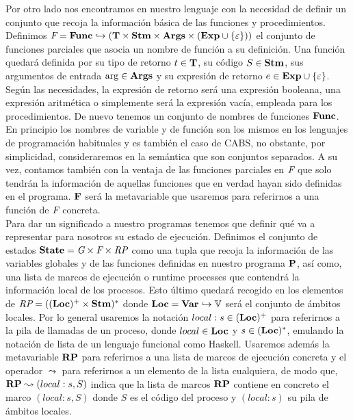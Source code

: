 Por otro lado nos encontramos en nuestro lenguaje con la necesidad de definir un conjunto que recoja la información básica de las funciones y procedimientos. Definimos $\Fs = \Func \hookrightarrow (\T \times \Stm \times \Args \times (\Exp \cup \{\varepsilon\}))$ el conjunto de funciones parciales que asocia un nombre de función a su definición. Una función quedará definida por su tipo de retorno $t \in \T$, su código $S \in \Stm$, sus argumentos de entrada $\args \in \Args$ y su expresión de retorno $e \in \Exp \cup \{\varepsilon\}$. Según las necesidades, la expresión de retorno será una expresión booleana, una expresión aritmética o simplemente será la expresión vacía, empleada para los procedimientos. De nuevo tenemos un conjunto de nombres de funciones $\Func$. En principio los nombres de variable y de función son los mismos en los lenguajes de programación habituales y es también el caso de CABS, no obstante, por simplicidad, consideraremos en la semántica que son conjuntos separados. A su vez, contamos también con la ventaja de las funciones parciales en $\Fs$ que solo tendrán la información de aquellas funciones que en verdad hayan sido definidas en el programa. $\F$ será la metavariable que usaremos para referirnos a una función de $\Fs$ concreta.\\

Para dar un significado a nuestro programas tenemos que definir qué va a representar para nosotros su estado de ejecución. Definimos el conjunto de estados $\State = \Gs \times \Fs \times \RPs$ como una tupla que recoja la información de las variables globales y de las funciones definidas en nuestro programa $\P$, así como, una lista de marcos de ejecución o runtime processes que contendrá la información local de los procesos. Esto último quedará recogido en los elementos de $\RPs = ((\loc)^+ \times \Stm)^*$ donde $\loc = \Var \hookrightarrow \V$ será el conjunto de ámbitos locales. Por lo general usaremos la notación $local:s \in (\loc)^+$ para referirnos a la pila de llamadas de un proceso, donde $local \in \loc$ y $s \in (\loc)^*$, emulando la notación de lista de un lenguaje funcional como Haskell. Usaremos además la metavariable $\RP$ para referirnos a una lista de marcos de ejecución concreta y el operador $\leadsto$ para referirnos a un elemento de la lista cualquiera, de modo que, $\RP \leadsto (local:s, S)$ indica que la lista de marcos $\RP$ contiene en concreto el marco $(local:s, S)$ donde $S$ es el código del proceso y $(local:s)$ su pila de ámbitos locales.\\

